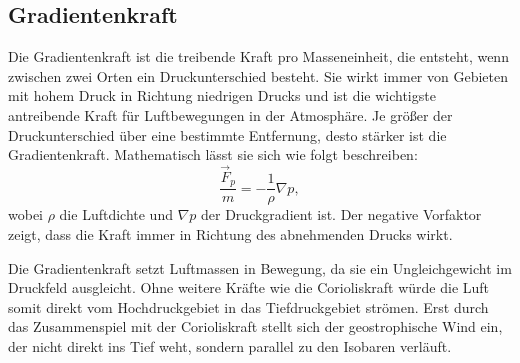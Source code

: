 \subsection{Gradientenkraft
\label{geostrophisch:subsection:gradient}}
Die Gradientenkraft ist die treibende Kraft pro Masseneinheit, die entsteht, wenn zwischen zwei Orten ein Druckunterschied besteht. Sie wirkt immer von Gebieten mit hohem Druck in Richtung niedrigen Drucks und ist die wichtigste antreibende Kraft für Luftbewegungen in der Atmosphäre. Je größer der Druckunterschied über eine bestimmte Entfernung, desto stärker ist die Gradientenkraft.
Mathematisch lässt sie sich wie folgt beschreiben:
\begin{equation}
\frac{\vec{F}_p} {m}
= 
-\frac{1}{\rho} \nabla p
\label{geostrophisch:equation4},
\end{equation}
wobei $\rho$ die Luftdichte und $\nabla p$ der Druckgradient ist. 
Der negative Vorfaktor zeigt, dass die Kraft immer in Richtung des abnehmenden Drucks wirkt.

\vspace{1em}

Die Gradientenkraft setzt Luftmassen in Bewegung, da sie ein Ungleichgewicht im Druckfeld ausgleicht. Ohne weitere Kräfte wie die Corioliskraft würde die Luft somit direkt vom Hochdruckgebiet in das Tiefdruckgebiet strömen. Erst durch das Zusammenspiel mit der Corioliskraft stellt sich der geostrophische Wind ein, der nicht direkt ins Tief weht, sondern parallel zu den Isobaren verläuft.



